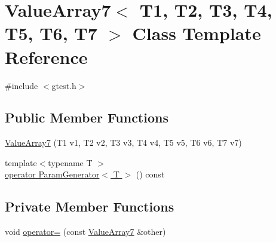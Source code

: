 \hypertarget{classtesting_1_1internal_1_1ValueArray7}{\section{\-Value\-Array7$<$ \-T1, \-T2, \-T3, \-T4, \-T5, \-T6, \-T7 $>$ \-Class \-Template \-Reference}
\label{d7/d43/classtesting_1_1internal_1_1ValueArray7}
}


{\ttfamily \#include $<$gtest.\-h$>$}

\subsection*{\-Public \-Member \-Functions}
\begin{DoxyCompactItemize}
\item 
\hyperlink{classtesting_1_1internal_1_1ValueArray7_a8d04636762cee3cc310c7074dced0795}{\-Value\-Array7} (\-T1 v1, \-T2 v2, \-T3 v3, \-T4 v4, \-T5 v5, \-T6 v6, \-T7 v7)
\item 
{\footnotesize template$<$typename T $>$ }\\\hyperlink{classtesting_1_1internal_1_1ValueArray7_a08ef46fa12c9dd8ef6fc630baeea89b7}{operator Param\-Generator$<$ T $>$} () const 
\end{DoxyCompactItemize}
\subsection*{\-Private \-Member \-Functions}
\begin{DoxyCompactItemize}
\item 
void \hyperlink{classtesting_1_1internal_1_1ValueArray7_a152e52027e7253828ff8fa2a96199c38}{operator=} (const \hyperlink{classtesting_1_1internal_1_1ValueArray7}{\-Value\-Array7} \&other)
\end{DoxyCompactItemize}
